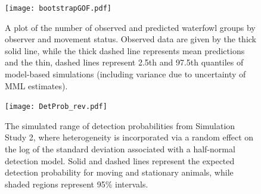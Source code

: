 \documentclass[aoas,preprint]{imsart}
\numberwithin{equation}{section}
\theoremstyle{plain}
\begin{document}
\pagebreak
\begin{figure}
\begin{center}
\texttt{[image: bootstrapGOF.pdf]}
\caption{A plot of the number of observed and predicted waterfowl groups by observer and movement status.  Observed data are given by the thick solid line, while the thick dashed line represents mean predictions and the thin, dashed lines represent 2.5th and 97.5th quantiles of model-based simulations (including variance due to uncertainty of MML estimates).  }
\label{fig:GOF}
\end{center}
\end{figure}

\pagebreak
\begin{figure}
\begin{center}
\texttt{[image: DetProb\_rev.pdf]}
\caption{The simulated range of detection probabilities from Simulation Study 2, where heterogeneity is incorporated via a random effect on the log of the standard deviation associated with a half-normal detection model.  Solid and dashed lines represent the expected detection probability for moving and stationary animals, while shaded regions represent 95\% intervals.}
\label{fig:hn}
\end{center}
\end{figure}
\end{document}
